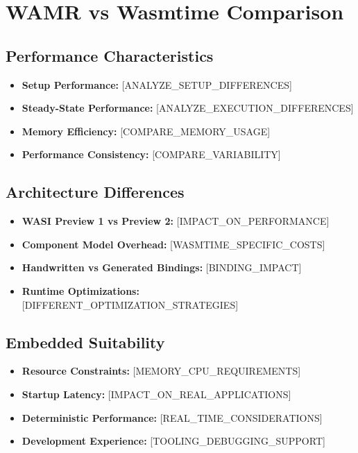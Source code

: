 \section{WAMR vs Wasmtime Comparison}
\label{sec:wamr-vs-wasmtime}


\subsection{Performance Characteristics}

\begin{itemize}
    \item \textbf{Setup Performance:} [ANALYZE\_SETUP\_DIFFERENCES]
    \item \textbf{Steady-State Performance:} [ANALYZE\_EXECUTION\_DIFFERENCES] 
    \item \textbf{Memory Efficiency:} [COMPARE\_MEMORY\_USAGE]
    \item \textbf{Performance Consistency:} [COMPARE\_VARIABILITY]
\end{itemize}

\subsection{Architecture Differences}

\begin{itemize}
    \item \textbf{WASI Preview 1 vs Preview 2:} [IMPACT\_ON\_PERFORMANCE]
    \item \textbf{Component Model Overhead:} [WASMTIME\_SPECIFIC\_COSTS]
    \item \textbf{Handwritten vs Generated Bindings:} [BINDING\_IMPACT]
    \item \textbf{Runtime Optimizations:} [DIFFERENT\_OPTIMIZATION\_STRATEGIES]
\end{itemize}

\subsection{Embedded Suitability}

\begin{itemize}
    \item \textbf{Resource Constraints:} [MEMORY\_CPU\_REQUIREMENTS]
    \item \textbf{Startup Latency:} [IMPACT\_ON\_REAL\_APPLICATIONS]
    \item \textbf{Deterministic Performance:} [REAL\_TIME\_CONSIDERATIONS]
    \item \textbf{Development Experience:} [TOOLING\_DEBUGGING\_SUPPORT]
\end{itemize}

